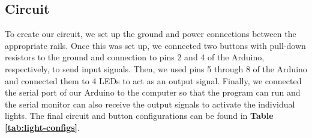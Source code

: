 \documentclass{article}
\begin{document}
\subsection{Circuit}

To create our circuit, we set up the ground and power connections between the appropriate rails. Once this was set up, we connected two buttons with pull-down resistors to the ground and connection to pins 2 and 4 of the Arduino, respectively, to send input signals. Then, we used pins 5 through 8 of the Arduino and connected them to 4 LEDs to act as an output signal. Finally, we connected the serial port of our Arduino to the computer so that the program can run and the serial monitor can also receive the output signals to activate the individual lights. The final circuit and button configurations can be found in \textbf{Table \ref{tab:light-configs}}.
\end{document}
